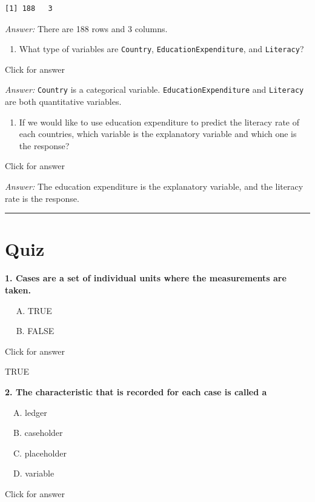 \documentclass[
]{book}
\providecommand{\tightlist}{%
  \setlength{\itemsep}{0pt}\setlength{\parskip}{0pt}}
\begin{document}
\begin{verbatim}
[1] 188   3
\end{verbatim}

\emph{Answer:} There are 188 rows and 3 columns.

\begin{enumerate}
\def\labelenumi{\alph{enumi}.}
\setcounter{enumi}{3}
\tightlist
\item
  What type of variables are \texttt{Country}, \texttt{EducationExpenditure}, and \texttt{Literacy}?
\end{enumerate}

Click for answer

\emph{Answer:} \texttt{Country} is a categorical variable. \texttt{EducationExpenditure} and \texttt{Literacy} are both quantitative variables.

\begin{enumerate}
\def\labelenumi{\alph{enumi}.}
\setcounter{enumi}{4}
\tightlist
\item
  If we would like to use education expenditure to predict the literacy rate of each countries, which variable is the explanatory variable and which one is the response?
\end{enumerate}

Click for answer

\emph{Answer:} The education expenditure is the explanatory variable, and the literacy rate is the response.

\begin{center}\rule{0.5\linewidth}{0.5pt}\end{center}

\hypertarget{quiz}{%
\section{Quiz}\label{quiz}}

\textbf{1. Cases are a set of individual units where the measurements are taken.}

  A. TRUE

  B. FALSE

Click for answer

TRUE

\textbf{2. The characteristic that is recorded for each case is called a}

 A. ledger

 B. caseholder

 C. placeholder

 D. variable

Click for answer
\end{document}
